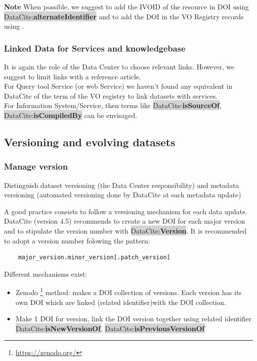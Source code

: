 \documentclass[11pt,a4paper]{ivoa}
\newcommand{\dataciteterm}[1]{\colorbox{lightgray}{DataCite:\textbf{#1}}}
\newcommand{\important}[1]{
	\begin{bigdescription}
		\item \color{ivoacolor}\textbf{Note} #1
	\end{bigdescription}
}
\begin{document}
\important{When possible, we suggest to add the IVOID of the resource in DOI using \dataciteterm{alternateIdentifier} and to add the DOI in the VO Registry records using \vorent{altIdentifier}.}

\subsubsection{Linked Data for Services and knowledgebase}
\label{sec:linkedataServiceKnowledgebase}
It is again the role of the Data Center to choose relevant links. However, we suggest to limit links with a reference article.\\

For Query tool Service (or web Service) we haven't found any equivalent in DataCite of the  term of the VO registry to link datasets with services. \\

For Information System/Service, then terms like \dataciteterm{isSourceOf}, \dataciteterm{isCompiledBy} can be envisaged.



\subsection{Versioning and evolving datasets}
\label{sec:version}

\subsubsection{Manage version}
Distinguish dataset versioning (the Data Center responsibility) and metadata versioning (automated versioning done by DataCite at each metadata update)

A good practice consists to follow a versioning mechanism for each data update. DataCite (version 4.5) recommends to create a new DOI for each major version and to stipulate the version number with \dataciteterm{Version}. 
It is recommended to adopt a version number folowing the pattern:
\begin{verbatim}
	major_version.minor_version[.patch_version]
\end{verbatim}


Different mechanisms exist:
\begin{itemize}
\item Zenodo \footnote{\url{https://zenodo.org/}} method: makes a DOI collection of versions. Each version has its own DOI which are linked (related identifier)with the DOI collection.
\item Make 1 DOI for version, link the DOI version together using related identifier \dataciteterm{isNewVersionOf}, \dataciteterm{isPreviousVersionOf}
\end{itemize}
\end{document}
